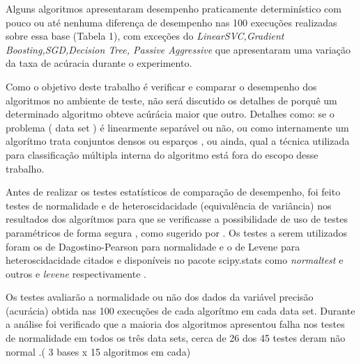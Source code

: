 \documentclass[11pt]{article}
\begin{document}
    Alguns algoritmos apresentaram desempenho praticamente determinístico com pouco ou até nenhuma diferença de desempenho nas 100 execuções realizadas sobre essa base (Tabela 1), com exceções do \emph{LinearSVC,Gradient Boosting,SGD,Decision Tree, Passive Aggressive} que apresentaram uma variação da taxa de acúracia durante o experimento.
    
    Como o objetivo deste trabalho é verificar e comparar o desempenho dos algoritmos no ambiente de teste, não será discutido os detalhes de porquê um determinado algoritmo obteve ac{\'u}r{\'a}cia maior que outro. Detalhes como: se o problema ( data set ) é linearmente separável ou não, ou como internamente um algorítmo trata conjuntos densos ou esparços , ou ainda, qual a técnica utilizada para classificação múltipla interna do algoritmo está fora do escopo desse trabalho.
    
    Antes de realizar os testes estatísticos de comparação de desempenho, foi feito testes de normalidade e de heteroscidacidade (equivalência de variância) nos resultados dos algorítmos para que se verificasse a possibilidade de uso de testes paramétricos de forma segura , como sugerido por \cite{Garciaetal2008}. Os testes a serem utilizados foram os de Dagostino-Pearson para normalidade e o de Levene para heteroscidacidade citados \cite{Garciaetal2008} e disponíveis no pacote scipy.stats \cite{scipy} como \emph{normaltest} e outros e \emph{levene} respectivamente .
    
    Os testes avaliarão a normalidade ou não dos dados da variável precisão (acurácia) obtida nas 100 execuções de cada algorítmo em cada data set. Durante a análise foi verificado que a maioria dos algoritmos apresentou falha nos testes de normalidade em todos os três data sets, cerca de 26 dos 45 testes deram não normal .( 3 bases x 15 algoritmos em cada)  
    
\end{document}
